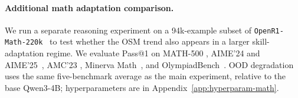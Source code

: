 \documentclass[11pt]{article}
\begin{document}
\paragraph{Additional math adaptation comparison.}
\begin{table}[!t]
\centering
\small
{}
\caption{\textbf{Math-adaptation results.} Pass@1 scores and averages are in
percent. OOD averages cover HumanEval, IFEval, TruthfulQA, MMLU-Redux, and BBH;
OOD drop is relative to the base Qwen3-4B. 
}
\label{tab:openr1-math-adaptation}
\end{table}

We run a separate reasoning experiment on a 94k-example subset of
\texttt{OpenR1-Math-220k}~\citep{openr1} to test whether the OSM trend also
appears in a larger skill-adaptation regime. We evaluate Pass@1 on MATH-500
\citep{hendrycks2021measuring}, AIME'24 and AIME'25~\citep{aime}, AMC'23
\citep{amc}, Minerva Math~\citep{lewkowycz2022solving}, and
OlympiadBench~\citep{he-etal-2024-olympiadbench}. OOD degradation uses the same
five-benchmark average as the main experiment, relative to the base Qwen3-4B;
hyperparameters are in Appendix~\ref{app:hyperparam-math}.
\end{document}
